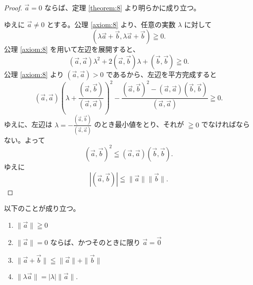 \begin{proof}
  \(\vec{a}=0\) ならば、定理 \ref{theorem:8} より明らかに成り立つ。

  ゆえに \(\vec{a}\neq0\) とする。公理 \ref{axiom:8} より、任意の実数 \(\lambda\) に対して
  \[(\lambda\vec{a}+\vec{b},\lambda\vec{a}+\vec{b})\geqq0.\]
  公理 \ref{axiom:8} を用いて左辺を展開すると、
  \[(\vec{a},\vec{a})\lambda^2+2(\vec{a},\vec{b})\lambda+(\vec{b},\vec{b})\geqq0.\]
  公理 \ref{axiom:8} より \((\vec{a},\vec{a})>0\) であるから、左辺を平方完成すると
  \[(\vec{a},\vec{a})\left(\lambda+\frac{(\vec{a},\vec{b})}{(\vec{a},\vec{a})}\right)^2-\frac{(\vec{a},\vec{b})^2-(\vec{a},\vec{a})(\vec{b},\vec{b})}{(\vec{a},\vec{a})}\geqq0.\]
  ゆえに、左辺は \(\displaystyle\lambda=-\frac{(\vec{a},\vec{b})}{(\vec{a},\vec{a})}\) のとき最小値をとり、それが \(\geqq0\) でなければならない。よって
  \[(\vec{a},\vec{b})^2\leqq(\vec{a},\vec{a})(\vec{b},\vec{b}).\]
  ゆえに
  \[|(\vec{a},\vec{b})|\leqq\|\vec{a}\|\|\vec{b}\|.\]
\end{proof}

\begin{thm}\label{theorem:10}
  以下のことが成り立つ。
  \begin{enumerate}
    \item \(\|\vec{a}\|\geqq0\)
    \item \(\|\vec{a}\|=0\) ならば、かつそのときに限り \(\vec{a}=\vec{0}\)
    \item \(\|\vec{a}+\vec{b}\|\leqq\|\vec{a}\|+\|\vec{b}\|\)
    \item \(\|\lambda\vec{a}\|=|\lambda|\|\vec{a}\|.\)
  \end{enumerate}
\end{thm}

